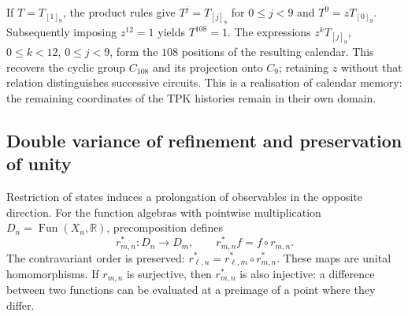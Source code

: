 If \(T=T_{[1]_9}\), the product rules give
\(T^j=T_{[j]_9}\) for \(0\le j<9\) and \(T^9=zT_{[0]_9}\).
Subsequently imposing \(z^{12}=1\) yields \(T^{108}=1\).
The expressions \(z^kT_{[j]_9}\), \(0\le k<12\), \(0\le j<9\),
form the \(108\) positions of the resulting calendar. This recovers
the cyclic group \(C_{108}\) and its projection onto \(C_9\); retaining
\(z\) without that relation distinguishes successive circuits. This is a
realisation of calendar memory: the remaining coordinates of
the TPK histories remain in their own domain.

\subsection{Double variance of refinement and preservation of unity}
\label{vi:hist:doble-varianza}

Restriction of states induces a prolongation of observables in the opposite
direction. For the function algebras with pointwise multiplication
\(D_n=\operatorname{Fun}(X_n,\mathbb R)\), precomposition defines
\begin{equation}
 r_{m,n}^*:D_n\longrightarrow D_m,
 \qquad r_{m,n}^*f=f\circ r_{m,n}.
 \label{vi:vi:hist:precomposicion}
\end{equation}
The contravariant order is preserved:
\(r_{\ell,n}^*=r_{\ell,m}^*\circ r_{m,n}^*\). These maps
are unital homomorphisms. If \(r_{m,n}\) is surjective, then
\(r_{m,n}^*\) is also injective: a difference between two functions can be
evaluated at a preimage of a point where they differ.

